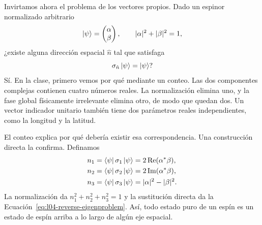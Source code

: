 Invirtamos ahora el problema de los vectores propios. Dado un espinor normalizado arbitrario
\begin{equation}
  \left\lvert\psi\right\rangle=
  \begin{pmatrix}\alpha\\\beta\end{pmatrix},
  \qquad
  |\alpha|^2+|\beta|^2=1,
  \label{eq:l04-general-spinor}
\end{equation}
¿existe alguna dirección espacial \(\hat n\) tal que satisfaga
\begin{equation}
  \sigma_{\hat n}\left\lvert\psi\right\rangle=\left\lvert\psi\right\rangle?
  \label{eq:l04-reverse-eigenproblem}
\end{equation}
Sí. En la clase, primero vemos por qué mediante un conteo. Las dos componentes complejas contienen cuatro números reales. La normalización elimina uno, y la fase global físicamente irrelevante elimina otro, de modo que quedan dos. Un vector indicador unitario también tiene dos parámetros reales independientes, como la longitud y la latitud.

\begin{classroomqa}
\end{classroomqa}

\begin{classroomqa}
\end{classroomqa}

El conteo explica por qué debería existir esa correspondencia. Una construcción directa la confirma. Definamos
\begin{align}
  n_1&=\left\langle\psi\right\rvert\sigma_1\left\lvert\psi\right\rangle
      =2\operatorname{Re}(\alpha^*\beta),
  \notag\\
  n_2&=\left\langle\psi\right\rvert\sigma_2\left\lvert\psi\right\rangle
      =2\operatorname{Im}(\alpha^*\beta),
  \notag\\
  n_3&=\left\langle\psi\right\rvert\sigma_3\left\lvert\psi\right\rangle
      =|\alpha|^2-|\beta|^2.
  \label{eq:l04-bloch-components}
\end{align}
La normalización da \(n_1^2+n_2^2+n_3^2=1\) y la sustitución directa da la Ecuación~\eqref{eq:l04-reverse-eigenproblem}. Así, todo estado puro de un espín es un estado de espín arriba a lo largo de algún eje espacial.

